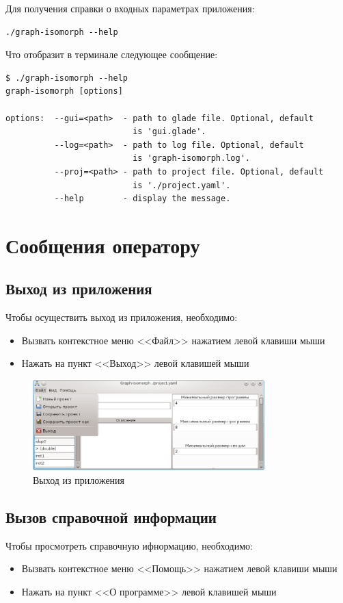 \documentclass[russian,utf8,emptystyle]{eskdtext}
\begin{document}
Для получения справки о входных параметрах приложения:
\begin{verbatim}
./graph-isomorph --help
\end{verbatim}

Что отобразит в терминале следующее сообщение:
\begin{verbatim}
$ ./graph-isomorph --help
graph-isomorph [options]

options:  --gui=<path>  - path to glade file. Optional, default 
                          is 'gui.glade'.
          --log=<path>  - path to log file. Optional, default 
                          is 'graph-isomorph.log'.
          --proj=<path> - path to project file. Optional, default 
                          is './project.yaml'. 
          --help        - display the message.
\end{verbatim}

\newpage
\section{Сообщения оператору}
\subsection{Выход из приложения}
Чтобы осуществить выход из приложения, необходимо:
\begin{itemize}
\item Вызвать контекстное меню <<Файл>> нажатием левой клавиши мыши
\item Нажать на пункт <<Выход>> левой клавишей мыши
\end{itemize}

\begin{figure}[h!]
\centering
\includegraphics[width=0.8\textwidth]{screen01}
\caption{Выход из приложения}
\end{figure}

\subsection{Вызов справочной информации}
Чтобы просмотреть справочную ифнормацию, необходимо:
\begin{itemize}
\item Вызвать контекстное меню <<Помощь>> нажатием левой клавиши мыши
\item Нажать на пункт <<О программе>> левой клавишей мыши
\end{itemize}
\end{document}
